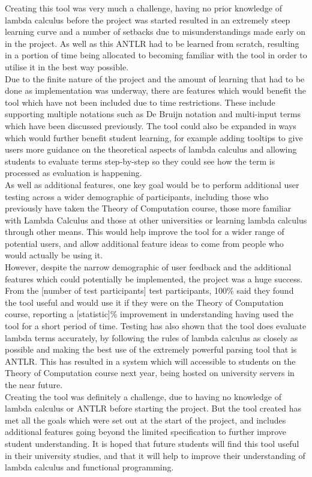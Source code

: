 \documentclass[a4paper,11pt]{report}
\begin{document}
Creating this tool was very much a challenge, having no prior knowledge of lambda calculus before the project was started resulted in an extremely steep learning curve and a number of setbacks due to misunderstandings made early on in the project. As well as this ANTLR had to be learned from scratch, resulting in a portion of time being allocated to becoming familiar with the tool in order to utilise it in the best way possible.\\

Due to the finite nature of the project and the amount of learning that had to be done as implementation was underway, there are features which would benefit the tool which have not been included due to time restrictions. These include supporting multiple notations such as De Bruijn notation and multi-input terms which have been discussed previously. The tool could also be expanded in ways which would further benefit student learning, for example adding tooltips to give users more guidance on the theoretical aspects of lambda calculus and allowing students to evaluate terms step-by-step so they could see how the term is processed as evaluation is happening.\\

As well as additional features, one key goal would be to perform additional user testing across a wider demographic of participants, including those who previously have taken the Theory of Computation course, those more familiar with Lambda Calculus and those at other universities or learning lambda calculus through other means. This would help improve the tool for a wider range of potential users, and allow additional feature ideas to come from people who would actually be using it.\\

However, despite the narrow demographic of user feedback and the additional features which could potentially be implemented, the project was a huge success. From the [number of test participants] test participants, 100\% said they found the tool useful and would use it if they were on the Theory of Computation course, reporting a [statistic]\% improvement in understanding having used the tool for a short period of time. Testing has also shown that the tool does evaluate lambda terms accurately, by following the rules of lambda calculus as closely as possible and making the best use of the extremely powerful parsing tool that is ANTLR. This has resulted in a system which will accessible to students on the Theory of Computation course next year, being hosted on university servers in the near future.\\

Creating the tool was definitely a challenge, due to having no knowledge of lambda calculus or ANTLR before starting the project. But the tool created has met all the goals which were set out at the start of the project, and includes additional features going beyond the limited specification to further improve student understanding. It is hoped that future students will find this tool useful in their university studies, and that it will help to improve their understanding of lambda calculus and functional programming.

\newpage
\printbibliography
\newpage
\end{document}
